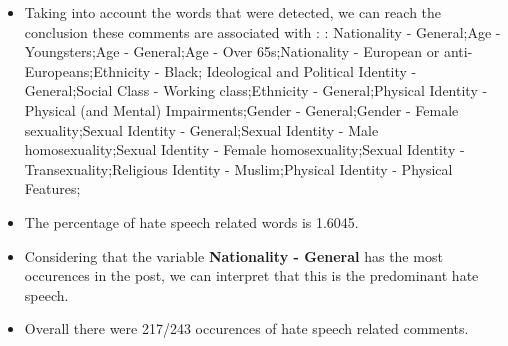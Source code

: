 \documentclass[11pt]{article}
\begin{document}
\begin{itemize}\item Taking into account the words that were detected, we can reach the conclusion these comments are associated with : : Nationality - General;Age - Youngsters;Age - General;Age - Over 65s;Nationality - European or anti-Europeans;Ethnicity - Black; Ideological and Political Identity - General;Social Class - Working class;Ethnicity - General;Physical Identity - Physical (and Mental) Impairments;Gender - General;Gender - Female sexuality;Sexual Identity - General;Sexual Identity - Male homosexuality;Sexual Identity - Female homosexuality;Sexual Identity - Transexuality;Religious Identity - Muslim;Physical Identity - Physical Features;%

\item The percentage of hate speech related words is 1.6045.

\item Considering that the variable \textbf{Nationality - General} has the most occurences in the post, we can interpret that this is the predominant hate speech.

\item Overall there were 217/243 occurences of hate speech related comments.\end{itemize}
\end{document}
